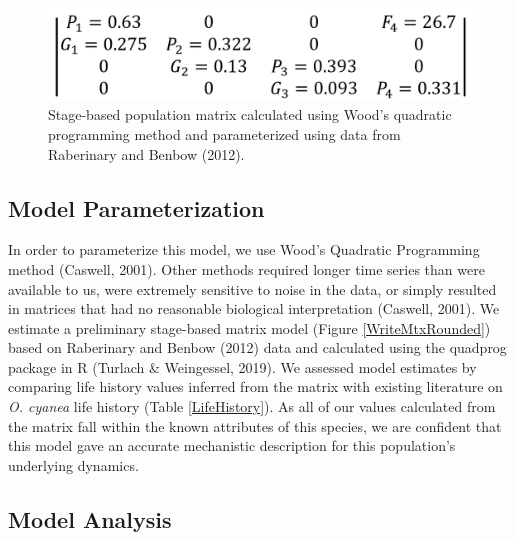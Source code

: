 \documentclass[
]{article}
\begin{document}
\begin{figure}
\includegraphics[width=1\linewidth]{MtxFilled} \caption{Stage-based population matrix calculated using Wood's quadratic programming method and parameterized using data from Raberinary and Benbow (2012). \label{WriteMtxRounded}}\label{fig:WriteMtxRounded}
\end{figure}

\hypertarget{model-parameterization}{%
\subsection{Model Parameterization}\label{model-parameterization}}

In order to parameterize this model, we use Wood's Quadratic Programming method (Caswell, 2001). Other methods required longer time series than were available to us, were extremely sensitive to noise in the data, or simply resulted in matrices that had no reasonable biological interpretation (Caswell, 2001). We estimate a preliminary stage-based matrix model (Figure \ref{WriteMtxRounded}) based on Raberinary and Benbow (2012) data and calculated using the quadprog package in R (Turlach \& Weingessel, 2019). We assessed model estimates by comparing life history values inferred from the matrix with existing literature on \emph{O. cyanea} life history (Table \ref{LifeHistory}). As all of our values calculated from the matrix fall within the known attributes of this species, we are confident that this model gave an accurate mechanistic description for this population's underlying dynamics.

\hypertarget{model-analysis}{%
\subsection{Model Analysis}\label{model-analysis}}
\end{document}
